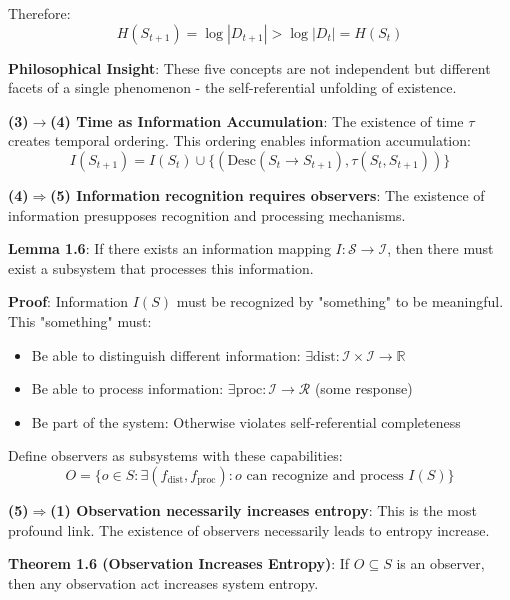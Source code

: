 Therefore:
\begin{equation}
H(S_{t+1}) = \log |D_{t+1}| > \log |D_t| = H(S_t)
\end{equation}

\textbf{Philosophical Insight}: These five concepts are not independent but different facets of a single phenomenon - the self-referential unfolding of existence.

\textbf{(3)$\rightarrow$(4) Time as Information Accumulation}:
The existence of time $\tau$ creates temporal ordering.
This ordering enables information accumulation:
\begin{equation}
I(S_{t+1}) = I(S_t) \cup \{(\text{Desc}(S_t \to S_{t+1}), \tau(S_t, S_{t+1}))\}
\end{equation}

\textbf{(4)$\Rightarrow$(5) Information recognition requires observers}:
The existence of information presupposes recognition and processing mechanisms.

\textbf{Lemma 1.6}: If there exists an information mapping $I: \mathcal{S} \to \mathcal{I}$, then there must exist a subsystem that processes this information.
\label{lem:1.6}

\textbf{Proof}: Information $I(S)$ must be recognized by "something" to be meaningful. This "something" must:
\begin{itemize}
\item Be able to distinguish different information: $\exists \text{dist}: \mathcal{I} \times \mathcal{I} \to \mathbb{R}$
\item Be able to process information: $\exists \text{proc}: \mathcal{I} \to \mathcal{R}$ (some response)
\item Be part of the system: Otherwise violates self-referential completeness
\end{itemize}

Define observers as subsystems with these capabilities:
\begin{equation}
O = \{o \in S: \exists (f_{\text{dist}}, f_{\text{proc}}): o \text{ can recognize and process } I(S)\}
\end{equation}

\textbf{(5)$\Rightarrow$(1) Observation necessarily increases entropy}:
This is the most profound link. The existence of observers necessarily leads to entropy increase.

\textbf{Theorem 1.6 (Observation Increases Entropy)}:
\label{thm:1.6}
If $O \subseteq S$ is an observer, then any observation act increases system entropy.

